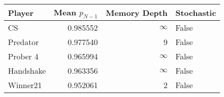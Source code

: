\begin{tabular}{lrrl}
\toprule
    Player &  Mean $p_{N-1}$ &  Memory Depth & Stochastic \\
\midrule
        CS &        0.985552 &            \(\infty\) &      False \\
  Predator &        0.977540 &             9 &      False \\
  Prober 4 &        0.965994 &            \(\infty\) &      False \\
 Handshake &        0.963356 &            \(\infty\) &      False \\
  Winner21 &        0.952061 &             2 &      False \\
\bottomrule
\end{tabular}
